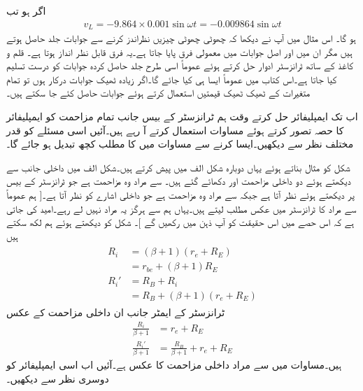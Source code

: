 اگر   ہو تب
\begin{align*}
v_L=-9.864 \times 0.001 \sin \omega t=-0.009864 \sin \omega t
\end{align*}
ہو گا۔
اس مثال میں آپ نے دیکھا کہ چھوٹی چھوٹی چیزیں نظراندز کرنے سے جوابات جلد حاصل ہوتے ہیں مگر ان میں اور اصل جوابات میں معمولی فرق پایا جاتا ہے۔یہ فرق قابل نظر انداز ہوتا ہے۔ قلم و کاغذ کے ساتھ ٹرانزسٹر ادوار حل کرتے ہوئے عموماً اسی طرح جلد حاصل کردہ جوابات کو درست تسلیم کیا جاتا ہے۔اس کتاب میں عموماً ایسا ہی کیا جائے گا۔اگر زیادہ ٹھیک جوابات درکار ہوں تو تمام متغیرات کے ٹھیک ٹھیک قیمتیں استعمال کرتے ہوئے جوابات حاصل کئے جا سکتے ہیں۔

اب تک ایمپلیفائر حل کرتے وقت ہم  ٹرانزسٹر کے بیس جانب تمام مزاحمت کو ایمپلیفائر کا حصہ تصور کرتے ہوئے مساوات  استعمال کرتے آ رہے ہیں۔آئیں اسی مسئلے کو قدر مختلف نظر سے دیکھیں۔ایسا کرنے سے مساوات  میں  کا مطلب کچھ تبدیل ہو جائے گا۔

شکل  کو مثال بناتے ہوئے یہاں دوبارہ شکل  الف میں پیش کرتے ہیں۔شکل  الف   میں داخلی جانب سے دیکھتے ہوئے دو داخلی مزاحمت  اور  دکھائے گئے ہیں۔ سے مراد وہ مزاحمت ہے جو ٹرانزسٹر کے بیس پر دیکھتے ہوئے نظر آتا ہے جبکہ  سے مراد وہ مزاحمت ہے جو داخلی اشارے  کو نظر آتا ہے۔[ ہم عموماً  سے مراد  کا ٹرانزسٹر میں عکس مطلب لیتے ہیں۔یہاں ہم  سے  ہرگز یہ مراد نہیں لے رہے۔امید کی جاتی ہے کہ اس حصے میں اس حقیقت کو آپ ذہن میں رکھیں گے ]۔ شکل کو دیکھتے ہوئے ہم لکھ سکتے ہیں
\begin{gather}
\begin{aligned}\label{مساوات_ٹرانزسٹر_داخلی_مزاحمت_کے_دو_اقسام}
R_i&=\left(\beta+1 \right) \left(r_e+R_E \right)\\
&=r_{be}+\left(\beta+1 \right) R_E\\
R_i'&=R_B+R_i\\
&=R_B+\left(\beta+1 \right) \left(r_e+R_E \right)
\end{aligned}
\end{gather}
ٹرانزسٹر کے ایمٹر جانب ان داخلی مزاحمت  کے عکس
\begin{align*}
\frac{R_i}{\beta+1}&=r_e+R_E\\
\frac{R_i'}{\beta+1}&=\frac{R_B}{\beta+1} +r_e+R_E
\end{align*}
ہیں۔مساوات   میں  سے مراد داخلی مزاحمت  کا عکس ہے۔آئیں اب اسی ایمپلیفائر کو دوسری نظر سے دیکھیں۔

